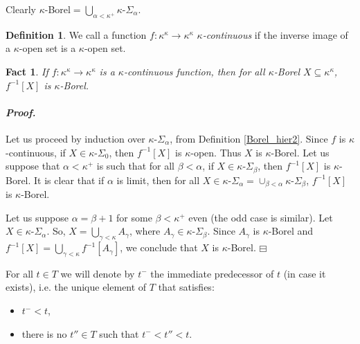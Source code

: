 \documentclass[12pt,a4paper]{amsart}
\newtheorem{fact}[thm]{Fact}
\theoremstyle{definition}
\newtheorem{defn}[thm]{Definition}
\theoremstyle{remark}
\renewcommand{\mid}{\mathrel{|}\allowbreak}
\newenvironment{cproof}{\paragraph{\emph{Proof.\,}}}{\hfill{$\boxminus$}\par\vspace{2mm}}
\begin{document}
Clearly $\kappa$-Borel$=\bigcup_{\alpha<\kappa^+}\kappa\text{-}\Sigma_\alpha$. 

\begin{defn}
We call a function $f\colon\kappa^\kappa\rightarrow\kappa^\kappa$ \emph{$\kappa$-continuous} if the inverse image of a $\kappa$-open set is a $\kappa$-open set.    
\end{defn}

\begin{fact}\label{funcion_borel}
    If $f\colon\kappa^\kappa\rightarrow\kappa^\kappa$ is a $\kappa$-continuous function, then for all $\kappa$-Borel $X\subseteq \kappa^\kappa$, $f^{-1}[X]$ is $\kappa$-Borel.
\end{fact}
\begin{cproof}
    Let us proceed by induction over $\kappa\text{-}\Sigma_\alpha$, from Definition \ref{Borel_hier2}. Since $f$ is $\kappa$-continuous, if $X\in \kappa\text{-}\Sigma_0$, then $f^{-1}[X]$ is $\kappa$-open. Thus $X$ is $\kappa$-Borel. Let us suppose that $\alpha<\kappa^+$ is such that for all $\beta<\alpha$, if $X\in \kappa\text{-}\Sigma_\beta$, then $f^{-1}[X]$ is $\kappa$-Borel. It is clear that if $\alpha$ is limit, then for all $X\in \kappa\text{-}\Sigma_\alpha=\cup_{\beta<\alpha}\kappa\text{-}\Sigma_{\beta}$, $f^{-1}[X]$ is $\kappa$-Borel.
    
    Let us suppose $\alpha=\beta+1$ for some $\beta<\kappa^+$ even (the odd case is similar). Let $X\in \kappa\text{-}\Sigma_\alpha$. So, $X=\bigcup_{\gamma<\kappa}A_\gamma$, where $A_\gamma\in \kappa\text{-}\Sigma_\beta$. Since $A_\gamma$ is $\kappa$-Borel and $f^{-1}[X]=\bigcup_{\gamma<\kappa}f^{-1}[A_\gamma]$, we conclude that $X$ is $\kappa$-Borel.
\end{cproof}


For all $t\in T$ we will denote by $t^-$ the immediate
predecessor of $t$ (in case it exists), i.e. the unique element of $T$ that satisfies:
 \begin{itemize}
     \item $t^-<t$,
     \item there is no $t''\in T$ such that $t^-<t''<t$.
 \end{itemize}
 
\end{document}
